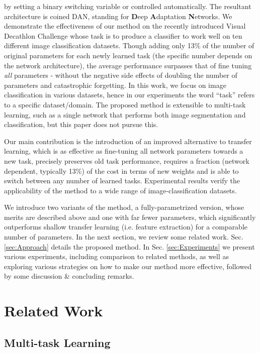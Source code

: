 \documentclass[10pt,journal,compsoc]{IEEEtran}
\makeatletter
\newcommand{\ie}{i.e.\@\xspace}
\makeatother
\begin{document}
by setting a binary switching variable or controlled automatically.
The resultant architecture is coined DAN, standing for \textbf{D}eep
\textbf{A}daptation \textbf{N}etworks. We demonstrate the effectiveness
of our method on the recently introduced Visual Decathlon Challenge
\cite{rebuffi2017learning} whose task is to produce a classifier
to work well on ten different image classification datasets. Though
adding only 13\% of the number of original parameters for each newly
learned task (the specific number depends on the network architecture),
the average performance surpasses that of fine tuning \emph{all }parameters
- without the negative side effects of doubling the number of parameters
and catastrophic forgetting. In this work, we focus on image classification
in various datasets, hence in our experiments the word ``task''
refers to a specific dataset/domain. The proposed method is extensible
to multi-task learning, such as a single network that performs both
image segmentation and classification, but this paper does not pursue
this.

Our main contribution is the introduction of an improved alternative
to transfer learning, which is as effective as fine-tuning all network
parameters towards a new task, precisely preserves old task performance,
requires a fraction (network dependent, typically 13\%) of the cost
in terms of new weights and is able to switch between any number of
learned tasks. Experimental results verify the applicability of the
method to a wide range of image-classification datasets. 

We introduce two variants of the method, a fully-parametrized version,
whose merits are described above and one with far fewer parameters,
which significantly outperforms shallow transfer learning (\ie feature
extraction) for a comparable number of parameters. In the next section,
we review some related work. Sec. \ref{sec:Approach} details the
proposed method. In Sec. \ref{sec:Experiments} we present various
experiments, including comparison to related methods, as well as exploring
various strategies on how to make our method more effective, followed
by some discussion \& concluding remarks.

\section{Related Work}

\subsection{Multi-task Learning}
\end{document}
